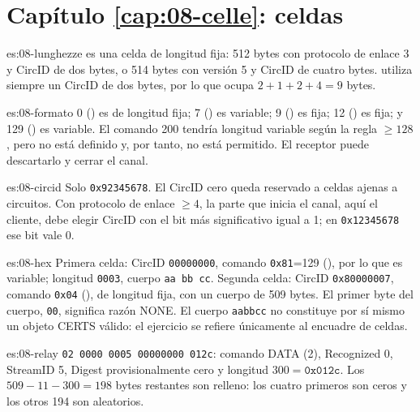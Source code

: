 \section*{Capítulo \ref{cap:08-celle}: celdas}

\begin{soluzione}{es:08-lunghezze}
 es una celda de longitud fija: 512 bytes con protocolo de enlace 3 y CircID de dos bytes, o 514 bytes con versión 5 y CircID de cuatro bytes.  utiliza siempre un CircID de dos bytes, por lo que ocupa $2+1+2+4=9$ bytes.
\end{soluzione}

\begin{soluzione}{es:08-formato}
0 () es de longitud fija; 7 () es variable; 9 () es fija; 12 () es fija; y 129 () es variable. El comando 200 tendría longitud variable según la regla $\ge128$, pero no está definido y, por tanto, no está permitido. El receptor puede descartarlo y cerrar el canal.
\end{soluzione}

\begin{soluzione}{es:08-circid}
Solo \texttt{0x92345678}. El CircID cero queda reservado a celdas ajenas a circuitos. Con protocolo de enlace $\ge4$, la parte que inicia el canal, aquí el cliente, debe elegir CircID con el bit más significativo igual a 1; en \texttt{0x12345678} ese bit vale 0.
\end{soluzione}

\begin{soluzione}{es:08-hex}
Primera celda: CircID \texttt{00000000}, comando \texttt{0x81}=129 (), por lo que es variable; longitud \texttt{0003}, cuerpo \texttt{aa bb cc}. Segunda celda: CircID \texttt{0x80000007}, comando \texttt{0x04} (), de longitud fija, con un cuerpo de 509 bytes. El primer byte del cuerpo, \texttt{00}, significa razón NONE. El cuerpo \texttt{aabbcc} no constituye por sí mismo un objeto CERTS válido: el ejercicio se refiere únicamente al encuadre de celdas.
\end{soluzione}

\begin{soluzione}{es:08-relay}
\texttt{02 0000 0005 00000000 012c}: comando DATA (2), Recognized 0, StreamID 5, Digest provisionalmente cero y longitud $300=\texttt{0x012c}$. Los $509-11-300=198$ bytes restantes son relleno: los cuatro primeros son ceros y los otros 194 son aleatorios.
\end{soluzione}

